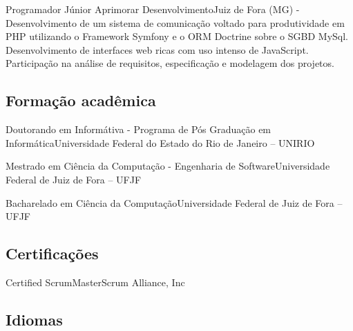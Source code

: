 \documentclass[12pt, a4paper, sans]{moderncv}
\begin{document}
{Programador Júnior}
{Aprimorar Desenvolvimento}{Juiz de Fora (MG)}{}
{- Desenvolvimento de um sistema de comunicação voltado para produtividade em PHP utilizando o Framework Symfony e o ORM Doctrine sobre o SGBD MySql. Desenvolvimento de interfaces web ricas com uso intenso de JavaScript. Participação na análise de requisitos, especificação e modelagem dos projetos.\newline{}
}


%
%
\subsection{Formação acadêmica}
{Doutorando em Informátiva - Programa de Pós Graduação em Informática}{Universidade Federal do Estado do Rio de Janeiro -- UNIRIO}{}{}{}


{Mestrado em Ciência da Computação - Engenharia de Software}{Universidade Federal de Juiz de Fora -- UFJF}{}{}{}

{Bacharelado em Ciência da Computação}{Universidade Federal de Juiz de Fora -- UFJF}{}{}{}

\subsection{Certificações}

{Certified ScrumMaster}{Scrum Alliance, Inc}{}{}{}



%
%

\subsection{Idiomas}

%
%

\end{document}
